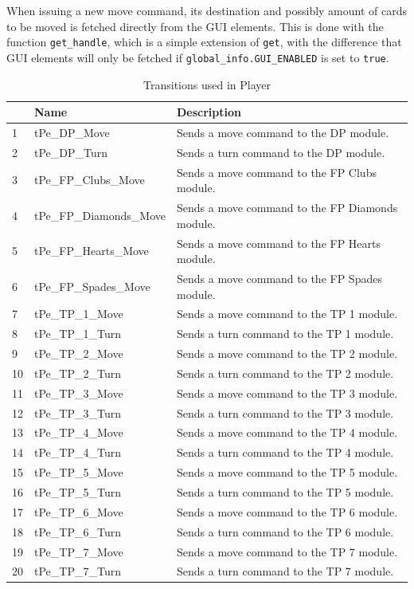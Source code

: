 \documentclass[runningheads,a4paper]{llncs}
\begin{document}
When issuing a new move command, its destination and possibly amount of cards to be moved is fetched directly from the GUI elements. This is done with the function \verb!get_handle!, which is a simple extension of \verb!get!, with the difference that GUI elements will only be fetched if \verb!global_info.GUI_ENABLED! is set to \verb!true!.
\begin{table}
	\caption{Transitions used in Player}
	\begin{tabular}{|l|l|l|}
		\hline
		& Name & Description \\
		\hline
		1 & tPe\_DP\_Move            &  Sends a move command to the DP module.  \\ \hline
		2 & tPe\_DP\_Turn            &  Sends a turn command to the DP module.  \\ \hline
		3 & tPe\_FP\_Clubs\_Move     &  Sends a move command to the FP Clubs module.  \\ \hline
		4 & tPe\_FP\_Diamonds\_Move  &  Sends a move command to the FP Diamonds module.  \\ \hline
		5 & tPe\_FP\_Hearts\_Move    &  Sends a move command to the FP Hearts module.  \\ \hline
		6 & tPe\_FP\_Spades\_Move    &  Sends a move command to the FP Spades module.  \\ \hline
		7 & tPe\_TP\_1\_Move         &  Sends a move command to the TP 1 module.  \\ \hline
		8 & tPe\_TP\_1\_Turn         &  Sends a turn command to the TP 1 module.  \\ \hline
		9 & tPe\_TP\_2\_Move         &  Sends a move command to the TP 2 module.  \\ \hline
		10 & tPe\_TP\_2\_Turn        &  Sends a turn command to the TP 2 module.  \\ \hline
		11 & tPe\_TP\_3\_Move        &  Sends a move command to the TP 3 module.  \\ \hline
		12 & tPe\_TP\_3\_Turn        &  Sends a turn command to the TP 3 module.  \\ \hline
		13 & tPe\_TP\_4\_Move        &  Sends a move command to the TP 4 module.  \\ \hline
		14 & tPe\_TP\_4\_Turn        &  Sends a turn command to the TP 4 module.  \\ \hline
		15 & tPe\_TP\_5\_Move        &  Sends a move command to the TP 5 module.  \\ \hline
		16 & tPe\_TP\_5\_Turn        &  Sends a turn command to the TP 5 module.  \\ \hline
		17 & tPe\_TP\_6\_Move        &  Sends a move command to the TP 6 module.  \\ \hline
		18 & tPe\_TP\_6\_Turn        &  Sends a turn command to the TP 6 module.  \\ \hline
		19 & tPe\_TP\_7\_Move        &  Sends a move command to the TP 7 module.  \\ \hline
		20 & tPe\_TP\_7\_Turn        &  Sends a turn command to the TP 7 module.  \\ \hline
	\end{tabular}
\end{table}
\clearpage
\end{document}
